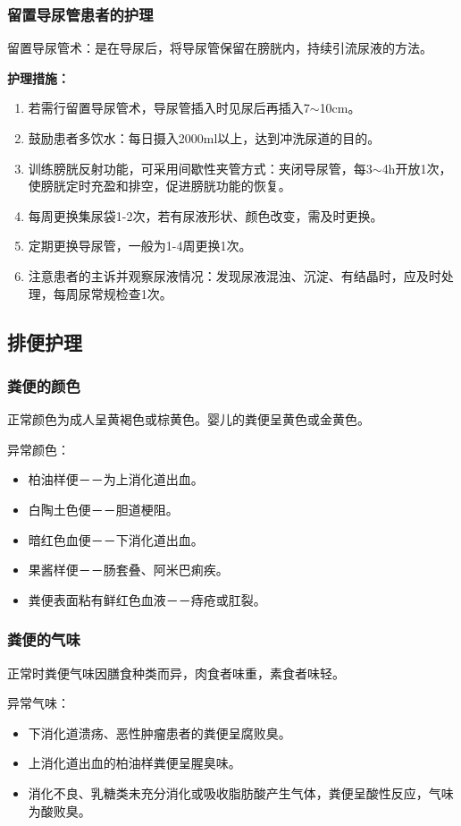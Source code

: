 \documentclass[11pt, a4paper]{ctexart}
\begin{document}
\subsubsection{留置导尿管患者的护理}
留置导尿管术：是在导尿后，将导尿管保留在膀胱内，持续引流尿液的方法。

\textbf{护理措施：}
\begin{enumerate}
	\item 若需行留置导尿管术，导尿管插入时见尿后再插入7$\sim$10cm。
	\item 鼓励患者多饮水：每日摄入2000ml以上，达到冲洗尿道的目的。
	\item 训练膀胱反射功能，可采用间歇性夹管方式：夹闭导尿管，每3$\sim$4h开放1次，使膀胱定时充盈和排空，促进膀胱功能的恢复。
	\item 每周更换集尿袋1-2次，若有尿液形状、颜色改变，需及时更换。
	\item 定期更换导尿管，一般为1-4周更换1次。
	\item 注意患者的主诉并观察尿液情况：发现尿液混浊、沉淀、有结晶时，应及时处理，每周尿常规检查1次。
\end{enumerate}

\subsection{排便护理}
\subsubsection{粪便的颜色}
正常颜色为成人呈黄褐色或棕黄色。婴儿的粪便呈黄色或金黄色。

异常颜色：
\begin{itemize}
	\item 柏油样便－－为上消化道出血。
	\item 白陶土色便－－胆道梗阻。
	\item 暗红色血便－－下消化道出血。
	\item 果酱样便－－肠套叠、阿米巴痢疾。
	\item 粪便表面粘有鲜红色血液－－痔疮或肛裂。
\end{itemize}

\subsubsection{粪便的气味}
正常时粪便气味因膳食种类而异，肉食者味重，素食者味轻。

异常气味：
\begin{itemize}
	\item 下消化道溃疡、恶性肿瘤患者的粪便呈腐败臭。
	\item 上消化道出血的柏油样粪便呈腥臭味。
	\item 消化不良、乳糖类未充分消化或吸收脂肪酸产生气体，粪便呈酸性反应，气味为酸败臭。
\end{itemize}
\end{document}
